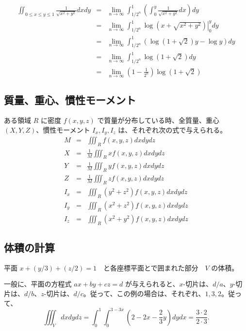 \begin{eg}
\begin{eqnarray*}
\iint_{0\leq x\leq y\leq 1}\frac{1}{\sqrt{x^2+y^2}}dxdy & = & 
\lim_{n\to\infty}\int_{1/2^n}^1\left(\int_0^y\frac{1}{\sqrt{x^2+y^2}}dx\right)dy\\
& = & \lim_{n\to\infty}\int_{1/2^n}^1\left.\log(x+\sqrt{x^2+y^2})\right|_0^ydy\\
& = & \lim_{n\to\infty}\int_{1/2^n}^1(\log(1+\sqrt{2})y - \log y)dy\\
& = & \lim_{n\to\infty}\int_{1/2^n}^1\log(1+\sqrt{2})dy\\
& = & \lim_{n\to\infty}\left(1-\frac1{2^n}\right)\log(1+\sqrt{2})
\end{eqnarray*}
\end{eg}

\subsection{質量、重心、慣性モーメント}
ある領域 $R$ に密度 $f(x,y,z)$ で質量が分布している時、全質量、重心 $(X,Y,Z)$、慣性モーメント $I_x,I_y,I_z$ は、それぞれ次の式で与えられる。
\begin{eqnarray}
M & = & \iiint_R f(x,y,z)dxdydz\\
X & = & \frac{1}{M}\iiint_R xf(x,y,z)dxdydz\\
Y & = & \frac{1}{M}\iiint_R yf(x,y,z)dxdydz\\
Z & = & \frac{1}{M}\iiint_R zf(x,y,z)dxdydz\\
I_x & = & \iiint_R(y^2+z^2)f(x,y,z)dxdydz\\
I_y & = & \iiint_R(x^2+z^2)f(x,y,z)dxdydz\\
I_z & = & \iiint_R(x^2+y^2)f(x,y,z)dxdydz
\end{eqnarray}

\subsection{体積の計算}
\begin{eg}
平面 $x+ (y/3) + (z/2) = 1$　と各座標平面とで囲まれた部分　$V$ の体積。

一般に、平面の方程式 $ax+by+cz = d$ が与えられると、$x$-切片は、$d/a$、$y$-切片は、$d/b$、$z$-切片は、$d/c$。従って、この例の場合は、それぞれ、$1,3,2$。従って、
$$\iiint_V dxdydz = \int_0^1\int_0^{3-3x}(2-2x -\frac23y)dydx = \frac{3\cdot 2}{2\cdot 3}.$$
\end{eg}

